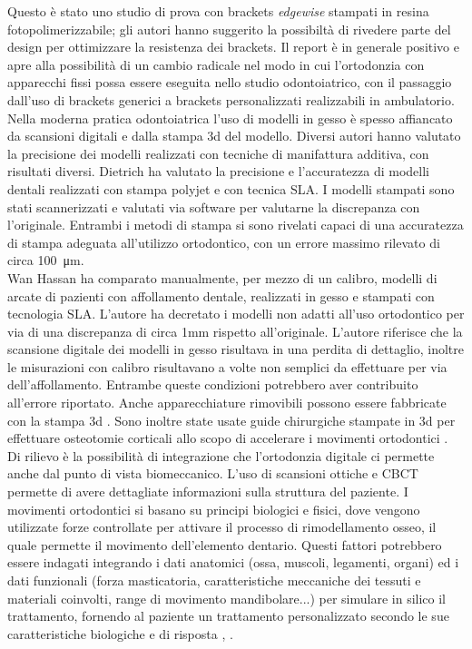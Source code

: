 Questo è stato uno studio di prova con brackets \emph{edgewise} stampati in resina fotopolimerizzabile; gli autori hanno suggerito la possibiltà di rivedere parte del design per ottimizzare la resistenza dei brackets. Il report è in generale positivo e apre alla possibilità di un cambio radicale nel modo in cui l'ortodonzia con apparecchi fissi possa essere eseguita nello studio odontoiatrico, con il passaggio dall'uso di brackets generici a brackets personalizzati realizzabili in ambulatorio.\\
Nella moderna pratica odontoiatrica l'uso di modelli in gesso è spesso affiancato da scansioni digitali e dalla stampa 3d del modello. Diversi autori hanno valutato la precisione dei modelli realizzati con tecniche di manifattura additiva, con risultati diversi. Dietrich \parencite{Reference112} ha valutato la precisione e l'accuratezza di modelli dentali realizzati con stampa polyjet e con tecnica SLA. I modelli stampati sono stati scannerizzati e valutati via software per valutarne la discrepanza con l'originale. Entrambi i metodi di stampa si sono rivelati capaci di una accuratezza di stampa adeguata all'utilizzo ortodontico, con un errore massimo rilevato di circa \SI{100}{\micro\metre}.\\
Wan Hassan \parencite{Reference113} ha comparato manualmente, per mezzo di un calibro, modelli di arcate di pazienti con affollamento dentale, realizzati in gesso e stampati con tecnologia SLA. L'autore ha decretato i modelli non adatti all'uso ortodontico per via di una discrepanza di circa 1mm rispetto all'originale. L'autore riferisce che la scansione digitale dei modelli in gesso risultava in una perdita di dettaglio, inoltre le misurazioni con calibro risultavano a volte non semplici da effettuare per via dell'affollamento. Entrambe queste condizioni potrebbero aver contribuito all'errore riportato. Anche apparecchiature rimovibili possono essere fabbricate con la stampa 3d \parencite{Reference111}. Sono inoltre state usate guide chirurgiche stampate in 3d per effettuare osteotomie corticali allo scopo di accelerare i movimenti ortodontici \parencite{Reference114}.\\
Di rilievo è la possibilità di integrazione che l'ortodonzia digitale ci permette anche dal punto di vista biomeccanico. L'uso di scansioni ottiche e CBCT permette di avere dettagliate informazioni sulla struttura del paziente. I movimenti ortodontici si basano su principi biologici e fisici, dove vengono utilizzate forze controllate per attivare il processo di rimodellamento osseo, il quale permette il movimento dell'elemento dentario. Questi fattori potrebbero essere indagati integrando i dati anatomici (ossa, muscoli, legamenti, organi) ed i dati funzionali (forza masticatoria, caratteristiche meccaniche dei tessuti e materiali coinvolti, range di movimento mandibolare...) per simulare in silico il trattamento, fornendo al paziente un trattamento personalizzato secondo le sue caratteristiche biologiche e di risposta \parencite{Reference110}, \parencite{Reference140}.
